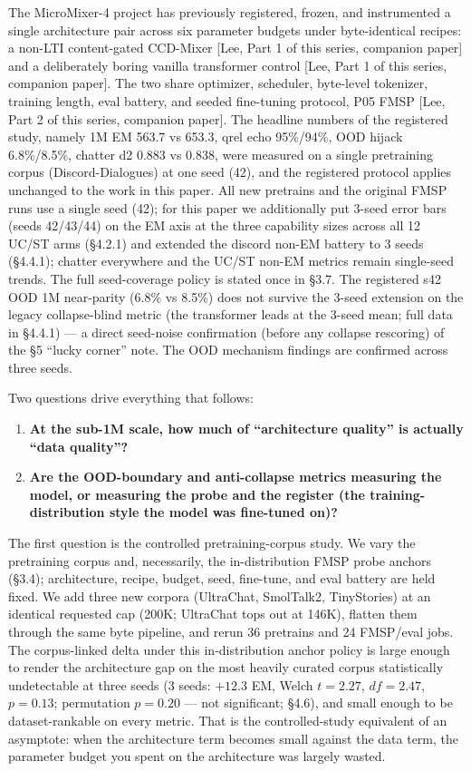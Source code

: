 \documentclass[11pt]{article}
\begin{document}
The MicroMixer-4 project has previously registered, frozen, and instrumented a single architecture pair across six parameter budgets under byte-identical recipes: a non-LTI content-gated CCD-Mixer [Lee, Part 1 of this series, companion paper] and a deliberately boring vanilla transformer control [Lee, Part 1 of this series, companion paper]. The two share optimizer, scheduler, byte-level tokenizer, training length, eval battery, and seeded fine-tuning protocol, P05 FMSP [Lee, Part 2 of this series, companion paper]. The headline numbers of the registered study, namely 1M EM 563.7 vs 653.3, qrel echo 95\%/94\%, OOD hijack 6.8\%/8.5\%, chatter d2 0.883 vs 0.838, were measured on a single pretraining corpus (Discord-Dialogues) at one seed (42), and the registered protocol applies unchanged to the work in this paper. All new pretrains and the original FMSP runs use a single seed (42); for this paper we additionally put 3-seed error bars (seeds 42/43/44) on the EM axis at the three capability sizes across all 12 UC/ST arms (\S4.2.1) and extended the discord non-EM battery to 3 seeds (\S4.4.1); chatter everywhere and the UC/ST non-EM metrics remain single-seed trends. The full seed-coverage policy is stated once in \S3.7. The registered s42 OOD 1M near-parity (6.8\% vs 8.5\%) does not survive the 3-seed extension on the legacy collapse-blind metric (the transformer leads at the 3-seed mean; full data in \S4.4.1) --- a direct seed-noise confirmation (before any collapse rescoring) of the \S5 ``lucky corner'' note. The OOD mechanism findings are confirmed across three seeds.

Two questions drive everything that follows:

\begin{enumerate}
  \item \textbf{At the sub-1M scale, how much of ``architecture quality'' is actually ``data quality''?}
  \item \textbf{Are the OOD-boundary and anti-collapse metrics measuring the model, or measuring the probe and the register (the training-distribution style the model was fine-tuned on)?}
\end{enumerate}

The first question is the controlled pretraining-corpus study. We vary the pretraining corpus and, necessarily, the in-distribution FMSP probe anchors (\S3.4); architecture, recipe, budget, seed, fine-tune, and eval battery are held fixed. We add three new corpora (UltraChat, SmolTalk2, TinyStories) at an identical requested cap (200K; UltraChat tops out at 146K), flatten them through the same byte pipeline, and rerun 36 pretrains and 24 FMSP/eval jobs. The corpus-linked delta under this in-distribution anchor policy is large enough to render the architecture gap on the most heavily curated corpus statistically undetectable at three seeds (3 seeds: $+12.3$ EM, Welch $t = 2.27$, $df = 2.47$, $p = 0.13$; permutation $p = 0.20$ --- not significant; \S4.6), and small enough to be dataset-rankable on every metric. That is the controlled-study equivalent of an asymptote: when the architecture term becomes small against the data term, the parameter budget you spent on the architecture was largely wasted.
\end{document}
